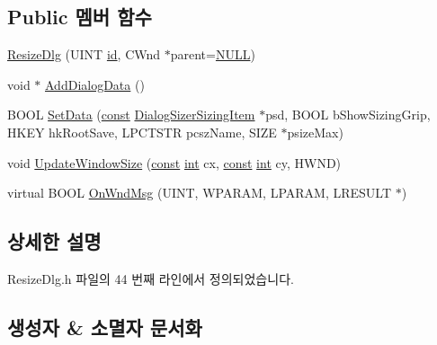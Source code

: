 \subsection*{Public 멤버 함수}
\begin{DoxyCompactItemize}
\item 
\mbox{\hyperlink{class_resize_dlg_a87bab778e9312f274ebe750d4c3a67ee}{Resize\+Dlg}} (U\+I\+NT \mbox{\hyperlink{_commands_8cpp_a7b7a6396b2c82ad46c6d8b2bf141a8dd}{id}}, C\+Wnd $\ast$parent=\mbox{\hyperlink{_system_8h_a070d2ce7b6bb7e5c05602aa8c308d0c4}{N\+U\+LL}})
\item 
void $\ast$ \mbox{\hyperlink{class_resize_dlg_a5657ce3f83f261aceaf138cd1c69f0fc}{Add\+Dialog\+Data}} ()
\item 
B\+O\+OL \mbox{\hyperlink{class_resize_dlg_a6a3965f44a0c2f5ba9aaa798a9a81df5}{Set\+Data}} (\mbox{\hyperlink{getopt1_8c_a2c212835823e3c54a8ab6d95c652660e}{const}} \mbox{\hyperlink{struct_dialog_sizer_sizing_item}{Dialog\+Sizer\+Sizing\+Item}} $\ast$psd, B\+O\+OL b\+Show\+Sizing\+Grip, H\+K\+EY hk\+Root\+Save, L\+P\+C\+T\+S\+TR pcsz\+Name, S\+I\+ZE $\ast$psize\+Max)
\item 
void \mbox{\hyperlink{class_resize_dlg_ae2d0d2b44dd32f668c6d9091b14bfc00}{Update\+Window\+Size}} (\mbox{\hyperlink{getopt1_8c_a2c212835823e3c54a8ab6d95c652660e}{const}} \mbox{\hyperlink{_util_8cpp_a0ef32aa8672df19503a49fab2d0c8071}{int}} cx, \mbox{\hyperlink{getopt1_8c_a2c212835823e3c54a8ab6d95c652660e}{const}} \mbox{\hyperlink{_util_8cpp_a0ef32aa8672df19503a49fab2d0c8071}{int}} cy, H\+W\+ND)
\item 
virtual B\+O\+OL \mbox{\hyperlink{class_resize_dlg_a9d3f421da2488db11224b0508be654fd}{On\+Wnd\+Msg}} (U\+I\+NT, W\+P\+A\+R\+AM, L\+P\+A\+R\+AM, L\+R\+E\+S\+U\+LT $\ast$)
\end{DoxyCompactItemize}


\subsection{상세한 설명}


Resize\+Dlg.\+h 파일의 44 번째 라인에서 정의되었습니다.



\subsection{생성자 \& 소멸자 문서화}
\mbox{\label{class_resize_dlg_a87bab778e9312f274ebe750d4c3a67ee}} 
